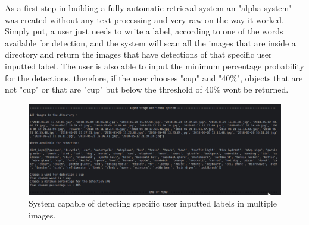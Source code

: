 As a first step in building a fully automatic retrieval system an "alpha system" was created without any text processing and very raw on the way it worked. Simply put, a user just needs to write a label, according to one of the words available for detection, and the system will scan all the images that are inside a directory and return the images that have detections of that specific user inputted label. The user is also able to input the minimum percentage probability for the detections, therefore, if the user chooses "cup" and "40\%", objects that are not "cup" or that are "cup" but below the threshold of 40\% wont be returned.

\begin{figure}[H]
  \centering
  \includegraphics[width = \textwidth]{Sections/4InitialWork/4_images_random/alpha.png}
  \caption{System capable of detecting specific user inputted labels in multiple images. }
  \label{fig:yolov3} 
\end{figure}




